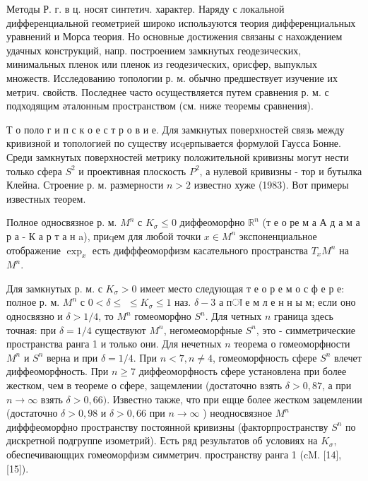 \documentclass[10pt]{article}
\begin{document}
Методы Р. г. в ц. носят синтетич. характер. Наряду с локальной дифференциальной геометрией широко используются теория дифференциальных уравнений и Морса теория. Но основные достижения связаны с нахождением удачных конструкций, напр. построением замкнутых геодезических, минимальных пленок или пленок из геодезических, орисфер, выпуклых множеств. Исследованию топологии р. м. обычно предшествует изучение их метрич. свойств. Последнее часто осуществляется путем сравнения р. м. с подходящим әталонным пространством (см. ниже теоремы сравнения).



Т о поло г и п с к о е с т р о в и е. Для замкнутых поверхностей связь между кривизной и топологией по существу исqерпывается формулой Гаусса Бонне. Среди замкнутых поверхностей метрику положительной кривизны могут нести только сфера $S^{2}$ и проективная плоскость $P^{2}$, а нулевой кривизны - тор и бутылка Клейна. Строение р. м. размерности $n>2$ известно хуже (1983). Вот примеры известных теорем.



Полное односвязное р. м. $M^{n}$ с $K_{\sigma} \leqslant 0$ диффеоморфно $\mathbb{R}^{n}$ (т е о ре м а А д а м а р а - К а р т а н a), приqем для любой точки $x \in M^{n}$ экспоненциальное отображение $\exp _{x}$ есть дифффеоморфизм касательного пространства $T_{x} M^{n}$ на $M^{n}$.



Для замкнутых р. м. с $K_{\sigma}>0$ имеет место следующая т е о р е м о с ф е р е: полное р. м. $M^{n}$ с $0<\delta \leqslant$ $\leqslant K_{\sigma} \leqslant 1$ наз. $\delta-3$ а пा е м л е н н ы м; если оно односвязно и $\delta>1 / 4$, то $M^{n}$ гомеоморфно $S^{n}$. Для четных $n$ граница здесь точная: при $\delta=1 / 4$ существуют $M^{n}$, негомеоморфные $S^{n}$, это - симметрические пространства ранга 1 и только они. Для нечетных $n$ теорема о гомеоморфности $M^{n}$ и $S^{n}$ верна и при $\delta=1 / 4$. При $n<7, n \neq 4$, гомеоморфность сфере $S^{n}$ влечет диффеоморфность. При $n \geqslant 7$ диффеоморфность сфере установлена при более жестком, чем в теореме о сфере, защемлении (достаточно взять $\delta>0,87$, а при $n \rightarrow \infty$ взять $\delta>0,66)$. Известно также, что при ещце более жестком зацемлении (достаточно $\delta>0,98$ и $\delta>0,66$ при $n \rightarrow \infty$ ) неодносвязное $M^{n}$ дифффеоморфно пространству постоянной кривизны (факторпространству $S^{n}$ по дискретной подгруппе изометрий). Есть ряд результатов об условиях на $K_{\sigma}$, обеспечивающцих гомеоморфизм симметрич. пространству ранга 1 (cM. [14], [15]).
\end{document}
